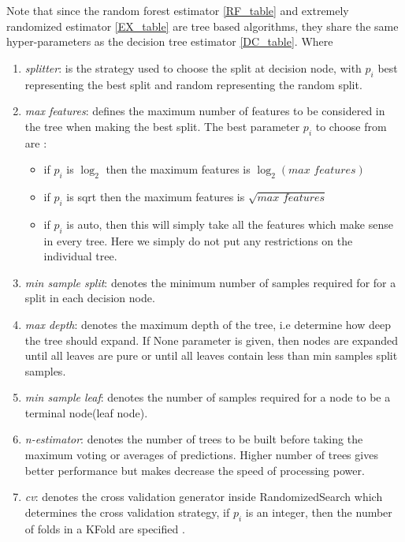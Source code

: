 Note that since the random forest estimator \ref{RF_table} and extremely randomized estimator 
\ref{EX_table} are tree based algorithms, they share the same hyper-parameters as the decision tree estimator \ref{DC_table}. Where 
\begin{enumerate}
\item \textit{splitter}: is the strategy used to choose the split at decision node, with $p_i$ best representing the best split and random representing the random split.

\item \textit{max features}: defines the maximum number of features to be considered in the tree when making the best split. The best parameter $p_i$ to choose from are : 
\begin{itemize}
\item if $p_i$ is $\log_2$ then the maximum features is  $\log_2\left(\textit{max features} \right)$

\item if $p_i$ is sqrt then the maximum features is $\sqrt{\textit{max features}}$ 
\item if $p_i$ is auto, then this will simply take all the features which make sense in every tree. Here we simply do not put any restrictions on the individual tree. 
\end{itemize}
\item \textit{min sample split}: denotes the minimum number of samples required for for a split in each decision node.
\item \textit{max depth}: denotes the maximum depth of the tree, i.e determine how deep the tree should expand. If None parameter is given, then nodes are expanded until all leaves are pure or until all leaves contain less than min samples split samples.

\item \textit{min sample leaf}: denotes the number of samples required for a node to be a terminal node(leaf node).
\item \textit{n-estimator}: denotes  the number of trees  to be built before taking the maximum voting or averages of predictions. Higher number of trees gives better performance but makes decrease the speed of processing power.
\item \textit{cv}: denotes the cross validation generator inside RandomizedSearch which determines the cross validation strategy, if $p_i$ is an integer, then the number of folds in a KFold are specified \citep{pedregosa2011scikit}. 
\end{enumerate}


